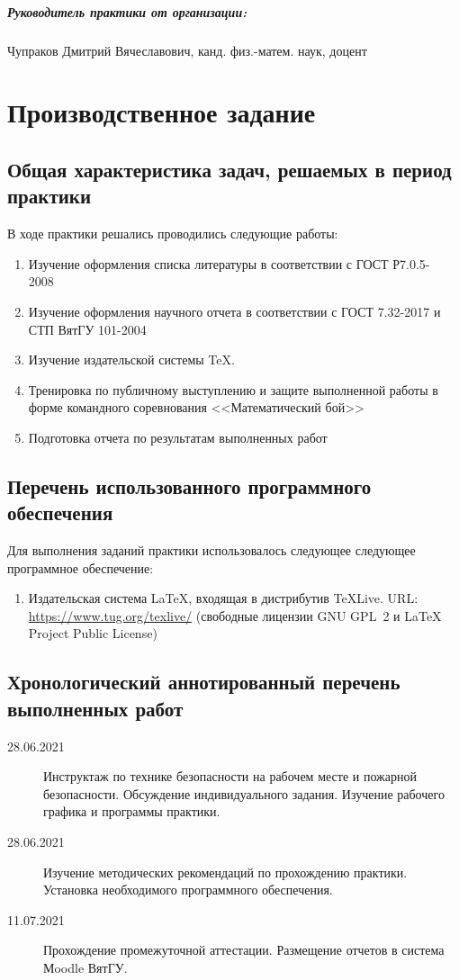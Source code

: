 \documentclass[14pt,Report]{diplomwork}
\begin{document}
			\paragraph{Руководитель практики от организации:}
			Чупраков Дмитрий Вячеславович, канд. физ.-матем. наук, доцент
			\chapter{Производственное задание}
			\section{Общая характеристика задач, решаемых в период практики}
			\label{ZUN}
			В ходе практики решались проводились следующие работы:
			\begin{enumerate}
			\item
				Изучение оформления списка литературы в соответствии с ГОСТ Р7.0.5-2008~\cite{Gost_R_7.0.5-2008_Bib}
			\item
				Изучение оформления научного отчета в соответствии с ГОСТ 7.32-2017 \cite{Gost_7.32-2017_NIR}  и СТП ВятГУ 101-2004~\cite{STP-101-2004}
			\item
				Изучение издательской системы \TeX.
			\item
				Тренировка по публичному выступлению и защите выполненной работы в форме командного соревнования <<Математический бой>>
			\item
				Подготовка отчета по результатам выполненных работ
			\end{enumerate}

			\section{Перечень использованного программного обеспечения}
			Для выполнения заданий практики использовалось следующее следующее программное обеспечение:
			\begin{enumerate}
			\item
				Издательская система \LaTeX, входящая в дистрибутив \TeX Live.
				URL: \url{https://www.tug.org/texlive/}
				(свободные лицензии GNU GPL~2 и LaTeX Project Public License)
			\end{enumerate}
			\section{Хронологический аннотированный перечень выполненных работ}
				\begin{description}
				\item[28.06.2021] Инструктаж по технике безопасности на рабочем месте и пожарной безопасности. Обсуждение индивидуального задания. Изучение рабочего графика и программы практики.
				\item[28.06.2021] Изучение методических рекомендаций по прохождению практики. Установка необходимого программного обеспечения. 
				\item[11.07.2021] Прохождение промежуточной аттестации. Размещение отчетов в система Мoodle ВятГУ.
			\end{description}
\end{document}
